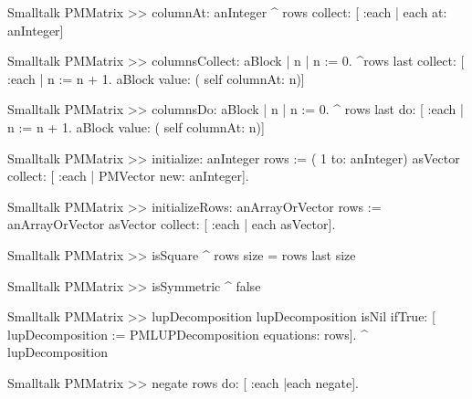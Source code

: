 \begin{displaycode}{Smalltalk}
PMMatrix >> columnAt: anInteger
    ^ rows collect: [ :each | each at: anInteger]
\end{displaycode}

\begin{displaycode}{Smalltalk}
PMMatrix >> columnsCollect: aBlock
    | n |
    n := 0.
    ^rows last collect: [ :each | n := n + 1. aBlock value: ( self 
                                                         columnAt: n)]
\end{displaycode}

\begin{displaycode}{Smalltalk}
PMMatrix >> columnsDo: aBlock
    | n |
    n := 0.
    ^ rows last do: [ :each | n := n + 1. aBlock value: ( self 
                                                         columnAt: n)]
\end{displaycode}

\begin{displaycode}{Smalltalk}
PMMatrix >> initialize: anInteger
    rows := ( 1 to: anInteger) asVector collect: [ :each | PMVector 
                                                      new: anInteger].
\end{displaycode}

\begin{displaycode}{Smalltalk}
PMMatrix >> initializeRows: anArrayOrVector
    rows := anArrayOrVector asVector collect: [ :each | each 
                                                            asVector].
\end{displaycode}

\begin{displaycode}{Smalltalk}
PMMatrix >> isSquare
    ^ rows size = rows last size
\end{displaycode}

\begin{displaycode}{Smalltalk}
PMMatrix >> isSymmetric
    ^ false
\end{displaycode}

\begin{displaycode}{Smalltalk}
PMMatrix >> lupDecomposition
    lupDecomposition isNil
        ifTrue: [ lupDecomposition := PMLUPDecomposition equations: 
                                                                rows].
    ^ lupDecomposition
\end{displaycode}

\begin{displaycode}{Smalltalk}
PMMatrix >> negate
    rows do: [ :each |each negate].
\end{displaycode}


